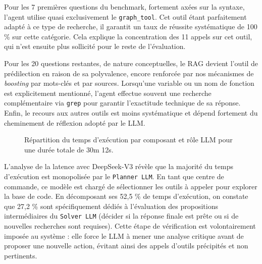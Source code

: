 Pour les 7 premières questions du benchmark, fortement axées sur la syntaxe, l'agent utilise quasi exclusivement le \texttt{graph\_tool}. Cet outil étant parfaitement adapté à ce type de recherche, il garantit un taux de réussite systématique de 100 \% sur cette catégorie. Cela explique la concentration des 11 appels sur cet outil, qui n'est ensuite plus sollicité pour le reste de l'évaluation.

Pour les 20 questions restantes, de nature conceptuelles, le RAG devient l'outil de prédilection en raison de sa polyvalence, encore renforcée par nos mécanismes de \textit{boosting} par mots-clés et par sources. Lorsqu'une variable ou un nom de fonction est explicitement mentionné, l'agent effectue souvent une recherche complémentaire via \texttt{grep} pour garantir l'exactitude technique de sa réponse. Enfin, le recours aux autres outils est moins systématique et dépend fortement du cheminement de réflexion adopté par le LLM.

\begin{figure}[H]
    \centering
    \caption{Répartition du temps d'exécution par composant et rôle LLM pour une durée totale de 30m 12s.}
    \label{fig:latency_dist}
\end{figure}

L'analyse de la latence avec DeepSeek-V3 révèle que la majorité du temps d'exécution est monopolisée par le \texttt{Planner LLM}. En tant que centre de commande, ce modèle est chargé de sélectionner les outils à appeler pour explorer la base de code. En décomposant ses 52,5 \% de temps d'exécution, on constate que 27,2 \% sont spécifiquement dédiés à l'évaluation des propositions intermédiaires du \texttt{Solver LLM} (décider si la réponse finale est prête ou si de nouvelles recherches sont requises). Cette étape de vérification est volontairement imposée au système : elle force le LLM à mener une analyse critique avant de proposer une nouvelle action, évitant ainsi des appels d'outils précipités et non pertinents.


